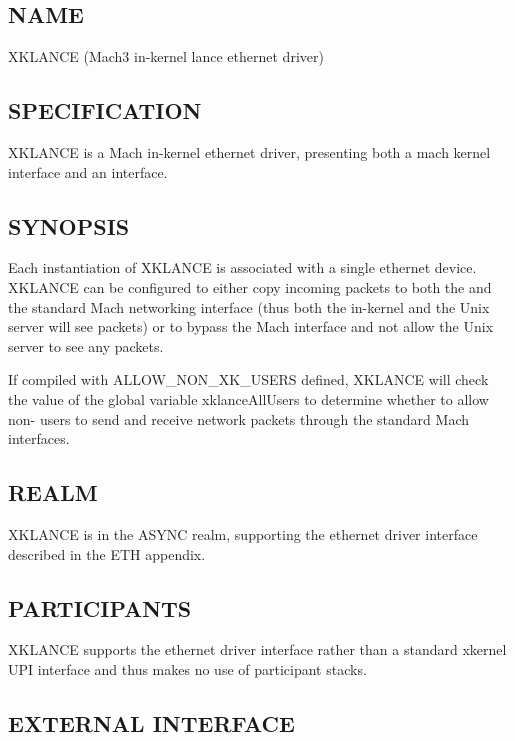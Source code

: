 %
%
%

\subsection*{NAME}

\noindent XKLANCE (Mach3 in-kernel lance ethernet driver)

\subsection*{SPECIFICATION}

\noindent

XKLANCE is a Mach in-kernel ethernet driver, presenting both a
mach kernel interface and an \xk{} interface.


\subsection*{SYNOPSIS}

\noindent 

Each instantiation of XKLANCE is associated with a single ethernet
device.  XKLANCE can be configured to either copy incoming packets
to both the \xk{} and the standard Mach networking interface (thus
both the in-kernel \xk{} and the Unix server will see packets) or to
bypass the Mach interface and not allow the Unix server to see any
packets. 

If compiled with ALLOW\_NON\_XK\_USERS defined, XKLANCE will check the
value of the global variable xklanceAllUsers to determine whether to
allow non-\xk{} users to send and receive network packets through the
standard Mach interfaces.


\subsection*{REALM}

XKLANCE is in the ASYNC realm, supporting the ethernet driver interface
described in the ETH appendix.


\subsection*{PARTICIPANTS}

XKLANCE supports the ethernet driver interface rather than a standard
xkernel UPI interface and thus makes no use of participant stacks.


\subsection*{EXTERNAL INTERFACE}

